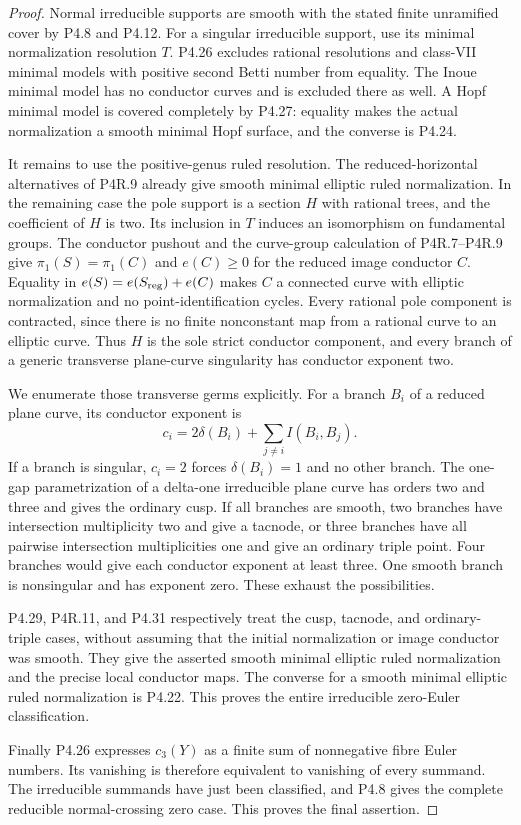 \begin{proof}
Normal irreducible supports are smooth with the stated finite
unramified cover by P4.8 and P4.12. For a singular irreducible
support, use its minimal normalization resolution $T$.
P4.26 excludes rational resolutions and class-VII minimal
models with positive second Betti number from equality.
The Inoue minimal model has no conductor curves and is
excluded there as well. A Hopf minimal model is covered
completely by P4.27: equality makes the actual normalization
a smooth minimal Hopf surface, and the converse is P4.24.

It remains to use the positive-genus ruled resolution.
The reduced-horizontal alternatives of P4R.9 already give
smooth minimal elliptic ruled normalization. In the remaining
case the pole support is a section $H$ with rational trees,
and the coefficient of $H$ is two. Its inclusion in $T$
induces an isomorphism on fundamental groups. The conductor
pushout and the curve-group calculation of P4R.7--P4R.9 give
$\pi_1(S)=\pi_1(C)$ and $e(C)\ge0$ for the reduced image
conductor $C$. Equality in
$e(S)=e(S_{\rm reg})+e(C)$ makes $C$ a connected curve
with elliptic normalization and no point-identification
cycles. Every rational pole component is contracted, since
there is no finite nonconstant map from a rational curve
to an elliptic curve. Thus $H$ is the sole strict conductor
component, and every branch of a generic transverse
plane-curve singularity has conductor exponent two.

We enumerate those transverse germs explicitly. For a branch
$B_i$ of a reduced plane curve, its conductor exponent is
\[
 c_i=2\delta(B_i)+\sum_{j\ne i}I(B_i,B_j).
\]
If a branch is singular, $c_i=2$ forces
$\delta(B_i)=1$ and no other branch. The one-gap
parametrization of a delta-one irreducible plane curve
has orders two and three and gives the ordinary cusp.
If all branches are smooth, two branches have intersection
multiplicity two and give a tacnode, or three branches
have all pairwise intersection multiplicities one and
give an ordinary triple point. Four branches would give
each conductor exponent at least three. One smooth branch
is nonsingular and has exponent zero. These exhaust the
possibilities.

P4.29, P4R.11, and P4.31 respectively treat the cusp,
tacnode, and ordinary-triple cases, without assuming that
the initial normalization or image conductor was smooth.
They give the asserted smooth minimal elliptic ruled
normalization and the precise local conductor maps.
The converse for a smooth minimal elliptic ruled
normalization is P4.22. This proves the entire irreducible
zero-Euler classification.

Finally P4.26 expresses $c_3(Y)$ as a finite sum of
nonnegative fibre Euler numbers. Its vanishing is therefore
equivalent to vanishing of every summand. The irreducible
summands have just been classified, and P4.8 gives the
complete reducible normal-crossing zero case. This proves
the final assertion.
\end{proof}
